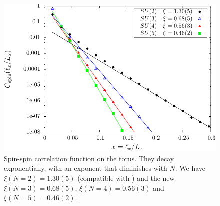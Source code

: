 \documentclass[11pt]{iopart}
\begin{document}
\begin{figure}[ht]
 \begin{center}
  \includegraphics{./figures/spin_corr.pdf}
 \end{center}
\caption{Spin-spin correlation function on the torus. They decay exponentially, with an exponent that diminishes with $N$. We have $\xi(N=2)=1.30(5)$ (compatible with \cite{RVB1}) and the new $\xi(N=3)=0.68(5)$, $\xi(N=4)=0.56(3)$ and $\xi(N=5)=0.46(2)$.}
\label{fig:corr_su2}
\end{figure}
\end{document}
